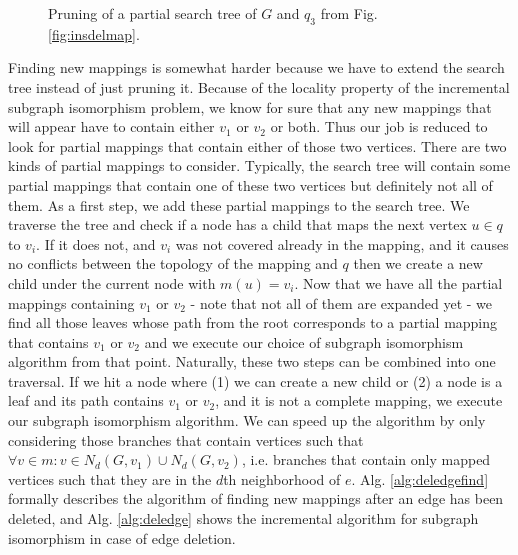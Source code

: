 \begin{figure}[h]
    \centering    
    \caption{Pruning of a partial search tree of $G$ and $q_3$ from Fig. \ref{fig:insdelmap}.}
    \label{fig:pruneex}
\end{figure}

Finding new mappings is somewhat harder because we have to extend the search tree instead
of just pruning it. Because of the locality property of the incremental subgraph isomorphism
problem, we know for sure that any new mappings that will appear have to contain either $v_1$
or $v_2$ or both. Thus our job is reduced to look for partial mappings that contain either of 
those two vertices. There are two kinds of partial mappings to consider. Typically, the search
tree will contain some partial mappings that contain one of these two vertices but definitely
not all of them. As a first step, we add these partial mappings to the search tree. We traverse 
the tree and check if a node has a child that maps the next vertex $u \in q$ to $v_i$. If it does
not, and $v_i$ was not covered already in the mapping, and it causes no conflicts between the 
topology of the mapping and $q$ then we create a new child under the current node with 
$m(u) = v_i$. Now that we have all the partial mappings containing $v_1$ or $v_2$ - note that not 
all of them are expanded yet - we find all those leaves whose path from the root corresponds to a 
partial mapping that contains $v_1$ or $v_2$ and we execute our choice of subgraph isomorphism 
algorithm from that point. Naturally, these two steps can be combined into one traversal. If we 
hit a node where (1) we can create a new child or (2) a node is a leaf and its path contains $v_1$ 
or $v_2$, and it is not a complete mapping, we execute our subgraph isomorphism algorithm. We
can speed up the algorithm by only considering those branches that contain vertices such that
$\forall v \in m: v \in N_d(G, v_1) \cup N_d(G, v_2)$, i.e. branches that contain only mapped 
vertices such that they are in the $d$th neighborhood of $e$. Alg. \ref{alg:deledgefind}
formally describes the algorithm of finding new mappings after an edge has been deleted, and
Alg. \ref{alg:deledge} shows the incremental algorithm for subgraph isomorphism in case of edge 
deletion.

